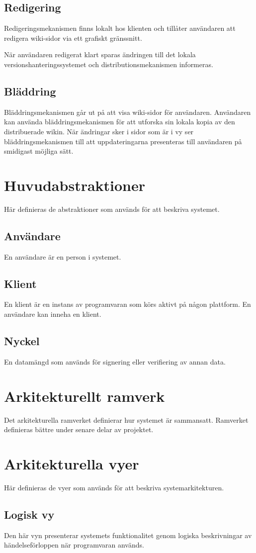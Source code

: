 \subsection{Redigering}
Redigeringsmekanismen finns lokalt hos klienten och tillåter användaren att redigera wiki-sidor via ett grafiskt gränssnitt.

När användaren redigerat klart sparas ändringen till det lokala versionshanteringssystemet och distributionsmekanismen informeras.
\subsection{Bläddring}
Bläddringsmekanismen går ut på att visa wiki-sidor för användaren. Användaren kan använda bläddringsmekanismen för att utforska sin lokala kopia av den distribuerade wikin. När ändringar sker i sidor som är i vy ser bläddringsmekanismen till att uppdateringarna presenteras till användaren på smidigast möjliga sätt.
\section{Huvudabstraktioner}
Här definieras de abstraktioner som används för att beskriva systemet.
\subsection*{Användare}
En användare är en person i systemet. 
\subsection*{Klient}
En klient är en instans av programvaran som körs aktivt på någon plattform. En användare kan inneha en klient.
\subsection*{Nyckel}
En datamängd som används för signering eller verifiering av annan data.
\section{Arkitekturellt ramverk}
Det arkitekturella ramverket definierar hur systemet är sammansatt. Ramverket definieras bättre under senare delar av projektet.
\section{Arkitekturella vyer}
Här definieras de vyer som används för att beskriva systemarkitekturen.
\subsection{Logisk vy}
Den här vyn presenterar systemets funktionalitet genom logiska beskrivningar av händelseförloppen när programvaran används.
